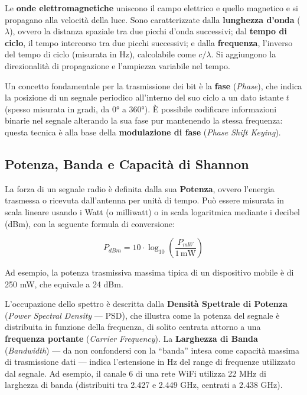 \documentclass[
  italian,
  openany]{book}
\begin{document}
Le \textbf{onde elettromagnetiche} uniscono il campo elettrico e quello
magnetico e si propagano alla velocità della luce. Sono caratterizzate
dalla \textbf{lunghezza d'onda} (\(\lambda\)), ovvero la distanza
spaziale tra due picchi d'onda successivi; dal \textbf{tempo di ciclo},
il tempo intercorso tra due picchi successivi; e dalla
\textbf{frequenza}, l'inverso del tempo di ciclo (misurata in Hz),
calcolabile come \(c/\lambda\). Si aggiungono la direzionalità di
propagazione e l'ampiezza variabile nel tempo.

Un concetto fondamentale per la trasmissione dei bit è la \textbf{fase}
(\emph{Phase}), che indica la posizione di un segnale periodico
all'interno del suo ciclo a un dato istante \(t\) (spesso misurata in
gradi, da 0° a 360°). È possibile codificare informazioni binarie nel
segnale alterando la sua fase pur mantenendo la stessa frequenza: questa
tecnica è alla base della \textbf{modulazione di fase} (\emph{Phase
Shift Keying}).

\subsection{Potenza, Banda e Capacità di
Shannon}\label{potenza-banda-e-capacituxe0-di-shannon}

La forza di un segnale radio è definita dalla sua \textbf{Potenza},
ovvero l'energia trasmessa o ricevuta dall'antenna per unità di tempo.
Può essere misurata in scala lineare usando i Watt (o milliwatt) o in
scala logaritmica mediante i decibel (dBm), con la seguente formula di
conversione:

\[P_{dBm}=10\cdot \log_{10}\left(\frac{P_{mW}}{1\,\text{mW}}\right)\]

Ad esempio, la potenza trasmissiva massima tipica di un dispositivo
mobile è di 250 mW, che equivale a 24 dBm.

L'occupazione dello spettro è descritta dalla \textbf{Densità Spettrale
di Potenza} (\emph{Power Spectral Density} --- PSD), che illustra come
la potenza del segnale è distribuita in funzione della frequenza, di
solito centrata attorno a una \textbf{frequenza portante} (\emph{Carrier
Frequency}). La \textbf{Larghezza di Banda} (\emph{Bandwidth}) --- da
non confondersi con la ``banda'' intesa come capacità massima di
trasmissione dati --- indica l'estensione in Hz del range di frequenze
utilizzato dal segnale. Ad esempio, il canale 6 di una rete WiFi
utilizza 22 MHz di larghezza di banda (distribuiti tra 2.427 e 2.449
GHz, centrati a 2.438 GHz).
\end{document}
